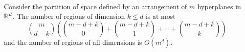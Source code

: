 \begin{theorem}[name=Buck~\cite{Bu43},label=thm:buck]
Consider the partition of space defined by an arrangement of $m$ hyperplanes in
$\mathbb{R}^d$.
The number of regions of dimension $k \le d$ is at most
\begin{displaymath}
	{m \choose d-k}
	\left(
		{m-d+k \choose 0}
		+
		{m-d+k \choose 1}
		+
		\cdots
		+
		{m-d+k \choose k}
	\right)
\end{displaymath}
and the number of regions of all dimensions is \(O(m^d)\).
\end{theorem}
